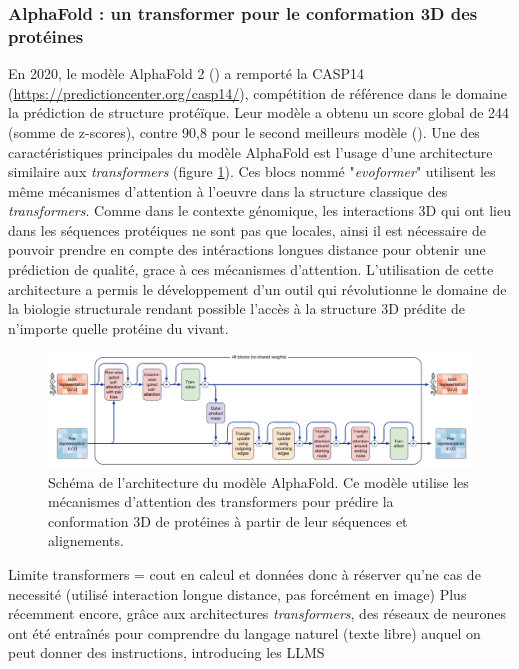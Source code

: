 \subsubsection{AlphaFold : un transformer pour le conformation 3D des protéines}
En 2020, le modèle AlphaFold 2 (\cite{jumper_highly_2021}) a remporté la CASP14 (\href{https://predictioncenter.org/casp14/}{https://predictioncenter.org/casp14/}), compétition de référence dans le domaine la prédiction de structure protéïque. Leur modèle a obtenu un score global de 244 (somme de z-scores), contre 90,8 pour le second meilleurs modèle (\cite{jumper_applying_2021}). Une des caractéristiques principales du modèle AlphaFold est l'usage d'une architecture similaire aux \textit{transformers} (figure \ref{fig:alphafold}). Ces blocs nommé "\textit{evoformer}" utilisent les même mécanismes d'attention à l'oeuvre dans la structure classique des \textit{transformers}. Comme dans le contexte génomique, les interactions 3D qui ont lieu dans les séquences protéiques ne sont pas que locales, ainsi il est nécessaire de pouvoir prendre en compte des intéractions longues distance pour obtenir une prédiction de qualité, grace à ces mécanismes d'attention. L'utilisation de cette architecture a permis le développement d'un outil qui révolutionne le domaine de la biologie structurale rendant possible l'accès à la structure 3D prédite de n'importe quelle protéine du vivant.
\begin{figure}[!htbp]
 \centering
 \includegraphics[width=1\textwidth]{figures/alphafold.png}
 \caption[Schéma de l'architecture du modèle AlphaFold]{Schéma de l'architecture du modèle AlphaFold. Ce modèle utilise les mécanismes d'attention des transformers pour prédire la conformation 3D de protéines à partir de leur séquences et alignements.}
 \label{fig:alphafold}
\end{figure}


Limite transformers = cout en calcul et données donc à réserver qu'ne cas de necessité (utilisé interaction longue distance, pas forcément en image)
Plus récemment encore, grâce aux architectures \textit{transformers}, des réseaux de neurones ont été entraînés pour comprendre du langage naturel (texte libre) auquel on peut donner des instructions, introducing les LLMS

